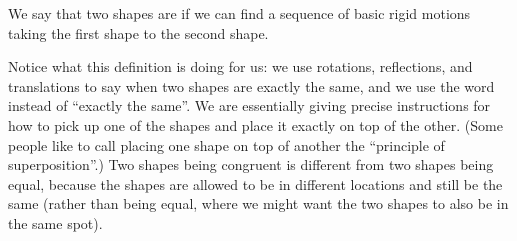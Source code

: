 \documentclass{ximera}
\begin{document}
\begin{definition}
We say that two shapes are  if we can find a sequence of basic rigid motions taking the first shape to the second shape.
\end{definition}
Notice what this definition is doing for us: we use rotations, reflections, and translations to say when two shapes are exactly the same, and we use the word  instead of ``exactly the same''. We are essentially giving precise instructions for how to pick up one of the shapes and place it exactly on top of the other. (Some people like to call placing one shape on top of another the ``principle of superposition''.) Two shapes being congruent is different from two shapes being equal, because the shapes are allowed to be in different locations and still be the same (rather than being equal, where we might want the two shapes to also be in the same spot).
\end{document}
